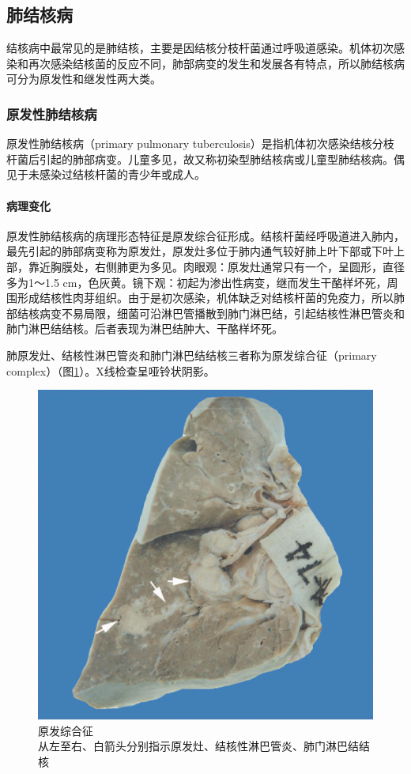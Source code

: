 \subsection{肺结核病}

结核病中最常见的是肺结核，主要是因结核分枝杆菌通过呼吸道感染。机体初次感染和再次感染结核菌的反应不同，肺部病变的发生和发展各有特点，所以肺结核病可分为原发性和继发性两大类。

\subsubsection{原发性肺结核病}

原发性肺结核病（primary pulmonary
tuberculosis）是指机体初次感染结核分枝杆菌后引起的肺部病变。儿童多见，故又称初染型肺结核病或儿童型肺结核病。偶见于未感染过结核杆菌的青少年或成人。

\paragraph{病理变化}
原发性肺结核病的病理形态特征是原发综合征形成。结核杆菌经呼吸道进入肺内，最先引起的肺部病变称为原发灶，原发灶多位于肺内通气较好肺上叶下部或下叶上部，靠近胸膜处，右侧肺更为多见。肉眼观：原发灶通常只有一个，呈圆形，直径多为1～1.5
cm，色灰黄。镜下观：初起为渗出性病变，继而发生干酪样坏死，周围形成结核性肉芽组织。由于是初次感染，机体缺乏对结核杆菌的免疫力，所以肺部结核病变不易局限，细菌可沿淋巴管播散到肺门淋巴结，引起结核性淋巴管炎和肺门淋巴结结核。后者表现为淋巴结肿大、干酪样坏死。

肺原发灶、结核性淋巴管炎和肺门淋巴结结核三者称为原发综合征（primary
complex）（图\ref{fig14-3}）。X线检查呈哑铃状阴影。

\begin{figure}[!htbp]
    \centering
    \includegraphics{./images/Image00227.jpg}
    \captionsetup{justification=centering}
    \caption{原发综合征\\ {\small 从左至右、白箭头分别指示原发灶、结核性淋巴管炎、肺门淋巴结结核}}
    \label{fig14-3}
\end{figure}


